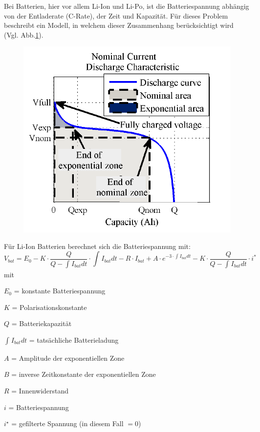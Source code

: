 Bei Batterien, hier vor allem Li-Ion und Li-Po, ist die Batteriespannung abhängig von der Entladerate (C-Rate), der Zeit und Kapazität. Für dieses Problem beschreibt \cite{Tremblay.2009} ein Modell, in welchem dieser Zusammenhang berücksichtigt wird (Vgl. Abb.\ref{abb:discharge_curve}). 
\begin{figure}[H]
	\centering
	\includegraphics[scale=0.5]{images/Discharge.PNG}
	\label{abb:discharge_curve}
\end{figure}
Für Li-Ion Batterien berechnet sich die Batteriespannung mit:
\begin{equation}
	V_{bat} = E_0-K\cdot\frac{Q}{Q-\int_{}^{} I_{bat} dt}\cdot\int_{}^{} I_{bat} dt - R\cdot I_{bat}+A\cdot e^{-3\cdot\int_{}^{} I_{bat} dt}-K\cdot\frac{Q}{Q-\int_{}^{} I_{bat} dt}\cdot i^* \label{eq:batteriespannung}
\end{equation}
mit 
\begin{description}
	\item \ensuremath{E_0} = konstante Batteriespannung
	\item \ensuremath{K} = Polarisationskonstante
	\item \ensuremath{Q} = Batteriekapazität
	\item \ensuremath{\int_{}^{} I_{bat} dt} = tatsächliche Batterieladung
	\item \ensuremath{A} = Amplitude der exponentiellen Zone
	\item \ensuremath{B} = inverse Zeitkonstante der exponentiellen Zone
	\item \ensuremath{R} = Innenwiderstand
	\item \ensuremath{i} = Batteriespannung
	\item \ensuremath{i^\star} = gefilterte Spannung (in diesem Fall \(= 0\))
\end{description}
